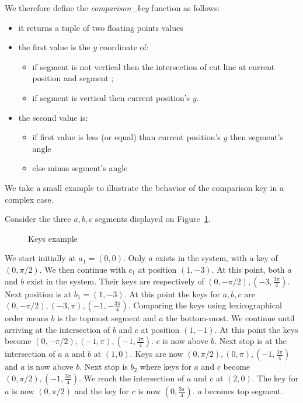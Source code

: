 \documentclass[a4paper, 11pt]{article}
\begin{document}
We therefore define the \emph{comparison\_key} function as follows:
\begin{itemize}
    \item it returns a tuple of two floating points values
    \item the first value is the $y$ coordinate of:
        \begin{itemize}
            \item if segment is not vertical then the intersection of cut line at current position and segment ;
            \item if segment is vertical then current position's $y$.
        \end{itemize}
    \item the second value is:
        \begin{itemize}
            \item if first value is less (or equal) than current position's $y$ then segment's angle
            \item else minus segment's angle
        \end{itemize}
\end{itemize}

We take a  small example to illustrate the behavior of the comparison key in a complex case.

Consider the three $a, b, c$ segments displayed on Figure~\ref{fig:keys}.

\begin{figure}[htbp]
    \begin{center}
    \end{center}
    \caption{Keys example}
    \label{fig:keys}
\end{figure}

We start initially at $a_1=(0,0)$. Only $a$ exists in the system, with a key of $(0, \pi/2)$.
We then continue with $c_1$ at position $(1, -3)$.
At this point, both $a$ and $b$ exist in the system.
Their keys are respectively of $(0, -\pi/2), (-3, \frac{3\pi}{4})$.
Next position is at $b_1=(1,-3)$. At this point the keys for $a, b, c$ are
$(0, -\pi/2), (-3, \pi), (-1, -\frac{3\pi}{4})$. Comparing the keys using lexicographical order
means $b$ is the topmost segment and $a$ the bottom-most.
We continue until arriving at the intersection of $b$ and $c$ at position $(1, -1)$.
At this point the keys become $(0, -\pi/2), (-1, \pi), (-1, \frac{3\pi}{4})$. $c$ is now above $b$.
Next stop is at the intersection of $a$ a and $b$ at $(1, 0)$.
Keys are now $(0, \pi/2), (0, \pi), (-1, \frac{3\pi}{4})$ and $a$ is now above $b$.
Next stop is $b_2$ where keys for $a$ and $c$ become $(0, \pi/2), (-1, \frac{3\pi}{4})$.
We reach the intersection of $a$ and $c$ at $(2, 0)$.
The key for $a$ is now $(0, \pi/2)$ and the key for $c$ is now $(0, \frac{3\pi}{4})$.
$a$ becomes top segment.
\end{document}
